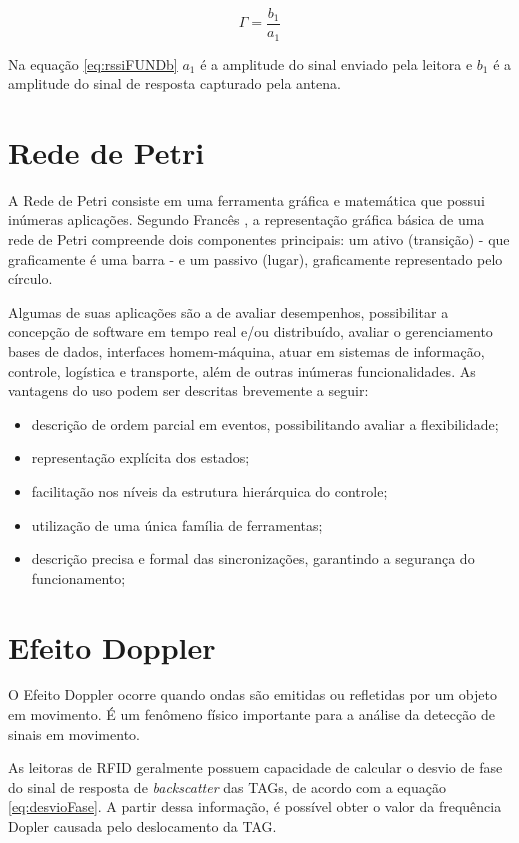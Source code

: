 \begin{equation}
    \Gamma = \frac{b_1}{a_1}
    \label{eq:rssiFUNDb}
\end{equation}

Na equação \ref{eq:rssiFUNDb} $a_1$ é a amplitude do sinal enviado pela leitora e $b_1$ é a amplitude do sinal de resposta capturado pela antena.
    
\section{Rede de Petri}
    
A Rede de Petri consiste em uma ferramenta gráfica e matemática que possui inúmeras aplicações. Segundo Francês \cite{Frances}, a representação gráfica básica de uma rede de Petri compreende dois componentes principais: um ativo (transição) - que graficamente é uma barra - e um passivo (lugar), graficamente representado pelo círculo. 

Algumas de suas aplicações são a de avaliar desempenhos, possibilitar a concepção de software em tempo real e/ou distribuído, avaliar o gerenciamento bases de dados, interfaces homem-máquina, atuar em sistemas de informação, controle, logística e transporte, além de outras inúmeras funcionalidades. As vantagens do uso podem ser descritas brevemente a seguir: \cite{Cardoso1997}

\begin{itemize}
    \item descrição de ordem parcial em eventos, possibilitando avaliar a flexibilidade;
    \item representação explícita dos estados;
    \item facilitação nos níveis da estrutura hierárquica do controle;
    \item utilização de uma única família de ferramentas; 
    \item descrição precisa e formal das sincronizações, garantindo a segurança do funcionamento;
\end{itemize}
    
\section{Efeito Doppler}

O Efeito Doppler ocorre quando ondas são emitidas ou refletidas por um objeto em movimento. É um fenômeno físico importante para a análise da detecção de sinais em movimento.

As leitoras de RFID geralmente possuem capacidade de calcular o desvio de fase do sinal de resposta de \textit{backscatter} das TAGs, de acordo com a equação \ref{eq:desvioFase}. A partir dessa informação, é possível obter o valor da frequência Dopler causada pelo deslocamento da TAG. \cite{nikitin2010phase} \cite{tesch2015rfid}

